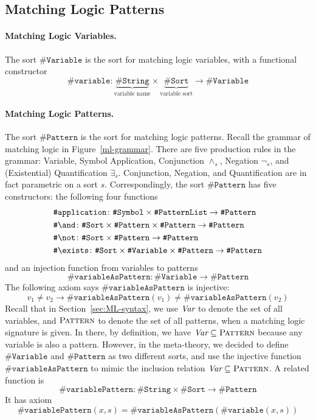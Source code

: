 \documentclass[UTF8,11pt]{article}
\theoremstyle{plain}
\theoremstyle{definition}
\theoremstyle{remark}
\newcommand{\sharpsymbol}{\#}
\newcommand{\KString}{\texttt{\sharpsymbol String}}
\newcommand{\KSort}{\texttt{\sharpsymbol Sort}}
\newcommand{\KSymbol}{\texttt{\sharpsymbol Symbol}}
\newcommand{\KPatternList}{\texttt{\sharpsymbol PatternList}}
\newcommand{\KVariable}{\texttt{\sharpsymbol Variable}}
\newcommand{\KVariableAsKPattern}{\texttt{\sharpsymbol variableAsPattern}}
\newcommand{\KvariablePattern}{\texttt{\sharpsymbol variablePattern}}
\newcommand{\KPattern}{\texttt{\sharpsymbol Pattern}}
\newcommand{\Kvariable}{\texttt{\sharpsymbol variable}}
\newcommand{\Kand}{\texttt{\sharpsymbol  \slashsymbol and}}
\newcommand{\Knot}{\texttt{\sharpsymbol  \slashsymbol not}}
\newcommand{\Kapplication}{\texttt{\sharpsymbol application}}
\newcommand{\Kexists}{\texttt{\sharpsymbol \slashsymbol  exists}}
\newcommand{\Pattern}{\textsc{Pattern}\xspace}
\newcommand{\slashsymbol}{\symbol{92}}
\begin{document}
\subsection{Matching Logic Patterns}
\label{sec:ML-patterns}

\paragraph{Matching Logic Variables.}
The sort $\KVariable$ is the sort for 
matching logic variables, with a functional constructor
\begin{equation*}
  \Kvariable \colon \underbrace{\KString}_\text{variable name} \times 
  \underbrace{\KSort}_\text{variable sort} \to \KVariable
\end{equation*}

\paragraph{Matching Logic Patterns.}
The sort $\KPattern$ is the sort for matching logic patterns.
Recall the grammar of matching logic in Figure~\ref{ml-grammar}.
There are five production rules in the grammar: Variable, Symbol Application, 
Conjunction $\wedge_s$, Negation $\neg_s$, and (Existential) Quantification 
$\exists_s$.
Conjunction, Negation, and Quantification are in fact 
parametric on a sort $s$.
Correspondingly, the sort $\KPattern$ has five constructors:
the following four functions
\begin{align*}
  & \Kapplication \colon \KSymbol \times \KPatternList \to \KPattern
  \\
  & \Kand \colon \KSort \times \KPattern \times \KPattern \to \KPattern
  \\
  & \Knot \colon \KSort \times \KPattern \to \KPattern
  \\
  & \Kexists \colon \KSort \times \KVariable \times \KPattern \to \KPattern
\end{align*}
and an injection function from variables to patterns
\begin{equation*}
  \KVariableAsKPattern \colon \KVariable \to \KPattern
\end{equation*}
The following axiom says $\KVariableAsKPattern$ is injective:
$$
v_1 \neq v_2 \to \KVariableAsKPattern(v_1) \neq \KVariableAsKPattern(v_2)
$$
Recall that in Section~\ref{sec:ML-syntax}, we use $\textit{Var}$ to denote the set of all variables, and $\Pattern$ to denote the set of all patterns, when a matching logic signature is given.
In there, by definition, we have $\Var \subseteq \Pattern$ because any variable is also a pattern.
However, in the meta-theory, we decided to define $\KVariable$ and $\KPattern$ as two different sorts, and use the injective function $\KVariableAsKPattern$ to mimic the inclusion relation $\Var \subseteq \Pattern$.
A related function is 
$$
\KvariablePattern \colon \KString \times \KSort \to \KPattern
$$
It has axiom
$$
\KvariablePattern(x,s) = \KVariableAsKPattern(\Kvariable(x,s))
$$
\end{document}
